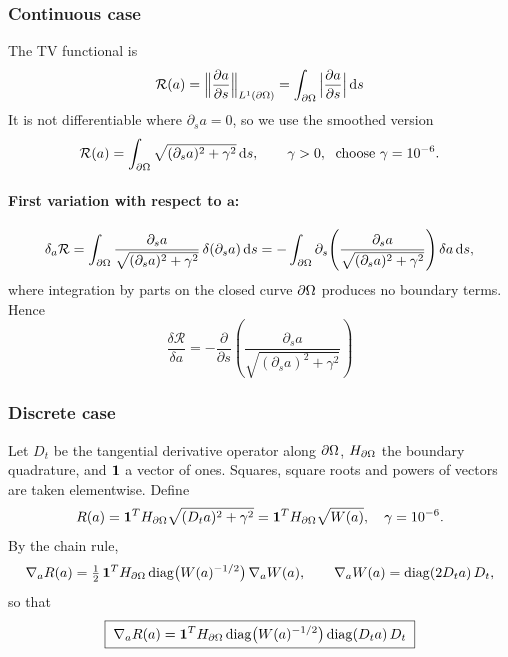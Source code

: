 \subsubsection{Continuous case}
The TV functional is
\begin{equation}
\mathcal{R}(a)=\Big\|\frac{\partial a}{\partial s}\Big\|_{L^1(\partial\Omega)}=\int_{\partial\Omega}\Big|\frac{\partial a}{\partial s}\Big|\,\mathrm{d} s
\end{equation}
It is not differentiable where $\partial_s a=0$, so we use the smoothed version
\begin{equation}
\mathcal{R}(a)=\int_{\partial\Omega}\sqrt{(\partial_s a)^2+\gamma^2}\,\mathrm{d} s,\qquad \gamma>0,\;\text{ choose }\gamma=10^{-6}.
\end{equation}

\paragraph{First variation with respect to $\mathbf{a}$:}
\begin{equation}
\delta_a\mathcal{R}=\int_{\partial\Omega}\frac{\partial_s a}{\sqrt{(\partial_s a)^2+\gamma^2}}\,\delta(\partial_s a)\,\mathrm{d} s
=-\int_{\partial\Omega}\partial_s\!\left(\frac{\partial_s a}{\sqrt{(\partial_s a)^2+\gamma^2}}\right)\delta a\,\mathrm{d} s ,
\end{equation}
where integration by parts on the closed curve $\partial\Omega$ produces no boundary terms. Hence
\begin{equation}
\boxed{\;\frac{\delta\mathcal{R}}{\delta a}=-\frac{\partial}{\partial s}\!\left(\frac{\partial_s a}{\sqrt{(\partial_s a)^2+\gamma^2}}\right)
\;}
\end{equation}

\subsubsection{Discrete case}
Let $D_t$ be the tangential derivative operator along $\partial\Omega$,
$H_{\partial\Omega}$ the boundary quadrature, and $\mathbf{1}$ a vector of ones. Squares, square roots and powers of
vectors are taken elementwise. Define
\begin{equation}
R(a)=\mathbf{1}^TH_{\partial\Omega}\sqrt{(D_ta)^2+\gamma^2}=\mathbf{1}^TH_{\partial\Omega}\sqrt{W(a)},\quad \gamma=10^{-6}.
\end{equation}
By the chain rule,
\begin{equation}
\nabla_aR(a)=\tfrac12\,\mathbf{1}^TH_{\partial\Omega}\operatorname{diag}\!\big(W(a)^{-1/2}\big)\,\nabla_aW(a),
\qquad
\nabla_aW(a)=\operatorname{diag}(2D_ta)\,D_t ,
\end{equation}
so that
\begin{equation}
\boxed{\;\nabla_aR(a)=\mathbf{1}^TH_{\partial\Omega}\operatorname{diag}\!\big(W(a)^{-1/2}\big)\operatorname{diag}(D_ta)\,D_t\;}
\end{equation}



